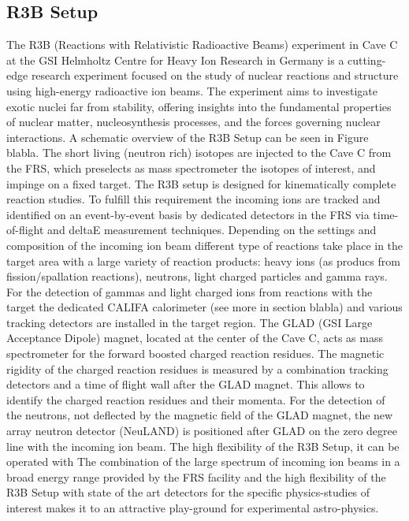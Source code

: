 \subsection{R3B Setup}
The R3B (Reactions with Relativistic Radioactive Beams) experiment in Cave C at the GSI Helmholtz Centre for Heavy Ion Research in Germany is a cutting-edge research experiment focused on the study of nuclear reactions and structure using high-energy radioactive ion beams. The experiment aims to investigate exotic nuclei far from stability, offering insights into the fundamental properties of nuclear matter, nucleosynthesis processes, and the forces governing nuclear interactions. A schematic overview of the R3B Setup can be seen in Figure blabla. \newline
The short living (neutron rich) isotopes are injected to the Cave C from the FRS, which preselects as mass spectrometer the isotopes of interest, and impinge on a fixed target. The R3B setup is designed for kinematically complete reaction studies. To fulfill this requirement the incoming ions are tracked and identified on an event-by-event basis by dedicated detectors in the FRS via time-of-flight and deltaE measurement techniques. Depending on the settings and composition of the incoming ion beam different type of reactions take place in the target area with a large variety of reaction products: heavy ions (as producs from fission/spallation reactions), neutrons, light charged particles and gamma rays. For the detection of gammas and light charged ions from reactions with the target the dedicated CALIFA calorimeter (see more in section blabla) and various tracking detectors are installed in the target region. The GLAD (GSI Large Acceptance Dipole) magnet, located at the center of the Cave C, acts as mass spectrometer for the forward boosted charged reaction residues. The magnetic rigidity of the charged reaction residues is measured by a combination tracking detectors and a time of flight wall after the GLAD magnet. This allows to identify the charged reaction residues and their momenta. For the detection of the neutrons, not deflected by the magnetic field of the GLAD magnet, the new array neutron detector (NeuLAND) is positioned after GLAD on the zero degree line with the incoming ion beam.\newline
The high flexibility of the R3B Setup, it can be operated with 
The combination of the large spectrum of incoming ion beams in a broad energy range provided by the FRS facility and the high flexibility of the R3B Setup with state of the art detectors for the specific physics-studies of interest makes it to an attractive play-ground for experimental astro-physics.\newline
